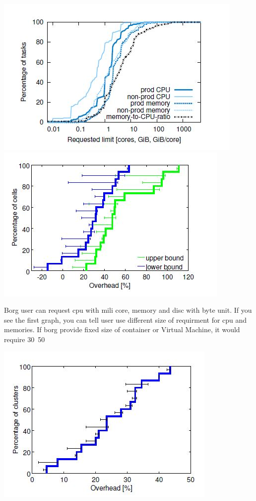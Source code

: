\documentclass[runningheads,a4paper]{llncs}
\begin{document}
\includegraphics{resourceRequest1}
\includegraphics{resourceRequest2}

Borg user can request cpu with mili core, memory and disc with byte unit. If you see the first graph, you can tell user use different size of requirment for cpu and memories.
If borg provide fixed size of container or Virtual Machine, it would require 30~50%

\includegraphics{reclamation1}
\end{document}
